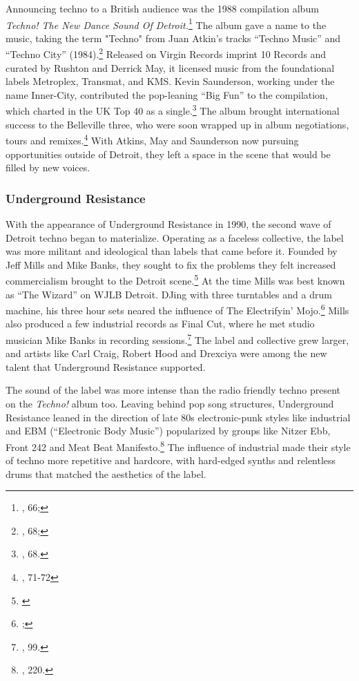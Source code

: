 \documentclass[12pt,twoside]{reedthesis}
\begin{document}
Announcing techno to a British audience was the 1988 compilation album \emph{Techno! The New Dance Sound Of Detroit.}\footnote{\cite{sickoTechnoRebelsRenegades2010}, 66;\cite{variousartistsTechnoNewDance1988}} The album gave a name to the music, taking the term "Techno" from Juan Atkin's tracks ``Techno Music'' and ``Techno City'' (1984).\footnote{\cite{sickoTechnoRebelsRenegades2010}, 68;\cite{cybotronTechnoCity1984}} Released on Virgin Records imprint 10 Records and curated by Rushton and Derrick May, it licensed music from the foundational labels Metroplex, Transmat, and KMS. Kevin Saunderson, working under the name Inner-City, contributed the pop-leaning ``Big Fun'' to the compilation, which charted in the UK Top 40 as a single.\footnote{\cite{sickoTechnoRebelsRenegades2010}, 68.} The album brought international success to the Belleville three,  who were soon wrapped up in album negotiations, tours and remixes.\footnote{\cite{sickoTechnoRebelsRenegades2010}, 71-72} With Atkins, May and Saunderson now pursuing opportunities outside of Detroit, they left a space in the scene that would be filled by new voices.

\subsubsection{Underground Resistance}

With the appearance of Underground Resistance in 1990, the second wave of Detroit techno began to materialize. Operating as a faceless collective, the label was more militant and ideological than labels that came before it. Founded by Jeff Mills and Mike Banks, they sought to fix the problems they felt increased commercialism brought to the Detroit scene.\footnote{\cite{schmidtJeffMillsLecture1998a}} At the time Mills was best known as ``The Wizard'' on WJLB Detroit. DJing with three turntables and a drum machine, his three hour sets neared the influence of The Electrifyin' Mojo.\footnote{\cite{schmidtJeffMillsLecture1998a};\cite{broughtonInterviewJeffMills2017a}} Mills also produced a few industrial records as Final Cut, where he met studio musician Mike Banks in recording sessions.\footnote{\cite{sickoTechnoRebelsRenegades2010}, 99.} The label and collective grew larger, and artists like Carl Craig, Robert Hood and Drexciya were among the new talent that Underground Resistance supported.

The sound of the label was more intense than the radio friendly techno present on the \emph{Techno!} album too. Leaving behind pop song structures, Underground Resistance leaned in the direction of late 80s electronic-punk styles like industrial and EBM (``Electronic Body Music'') popularized by groups like Nitzer Ebb, Front 242 and Meat Beat Manifesto.\footnote{\cite{reynoldsGenerationEcstasyWorld1998}, 220.} The influence of industrial made their style of techno more repetitive and hardcore, with hard-edged synths and relentless drums that matched the aesthetics of the label.
\end{document}
